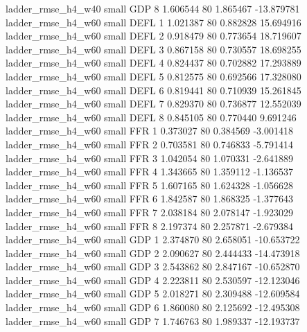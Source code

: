       ladder_rmse_h4_w40      small      GDP                 8 1.606544 80       1.865467         -13.879781
      ladder_rmse_h4_w60      small     DEFL                 1 1.021387 80       0.882828          15.694916
      ladder_rmse_h4_w60      small     DEFL                 2 0.918479 80       0.773654          18.719607
      ladder_rmse_h4_w60      small     DEFL                 3 0.867158 80       0.730557          18.698255
      ladder_rmse_h4_w60      small     DEFL                 4 0.824437 80       0.702882          17.293889
      ladder_rmse_h4_w60      small     DEFL                 5 0.812575 80       0.692566          17.328080
      ladder_rmse_h4_w60      small     DEFL                 6 0.819441 80       0.710939          15.261845
      ladder_rmse_h4_w60      small     DEFL                 7 0.829370 80       0.736877          12.552039
      ladder_rmse_h4_w60      small     DEFL                 8 0.845105 80       0.770440           9.691246
      ladder_rmse_h4_w60      small      FFR                 1 0.373027 80       0.384569          -3.001418
      ladder_rmse_h4_w60      small      FFR                 2 0.703581 80       0.746833          -5.791414
      ladder_rmse_h4_w60      small      FFR                 3 1.042054 80       1.070331          -2.641889
      ladder_rmse_h4_w60      small      FFR                 4 1.343665 80       1.359112          -1.136537
      ladder_rmse_h4_w60      small      FFR                 5 1.607165 80       1.624328          -1.056628
      ladder_rmse_h4_w60      small      FFR                 6 1.842587 80       1.868325          -1.377643
      ladder_rmse_h4_w60      small      FFR                 7 2.038184 80       2.078147          -1.923029
      ladder_rmse_h4_w60      small      FFR                 8 2.197374 80       2.257871          -2.679384
      ladder_rmse_h4_w60      small      GDP                 1 2.374870 80       2.658051         -10.653722
      ladder_rmse_h4_w60      small      GDP                 2 2.090627 80       2.444433         -14.473918
      ladder_rmse_h4_w60      small      GDP                 3 2.543862 80       2.847167         -10.652870
      ladder_rmse_h4_w60      small      GDP                 4 2.223811 80       2.530597         -12.123046
      ladder_rmse_h4_w60      small      GDP                 5 2.018271 80       2.309488         -12.609584
      ladder_rmse_h4_w60      small      GDP                 6 1.860080 80       2.125692         -12.495308
      ladder_rmse_h4_w60      small      GDP                 7 1.746763 80       1.989337         -12.193737
